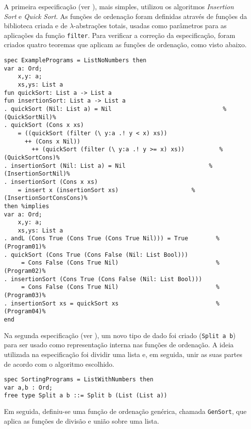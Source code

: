 A primeira especificação (ver ), mais simples, utilizou os algoritmos \textit{Insertion Sort} e \textit{Quick Sort}.
As funções de ordenação foram definidas através de funções da biblioteca criada e de $\lambda$-abstrações totais, usadas como parâmetros para as aplicações da função \Verb.filter..
Para verificar a correção da especificação, foram criados quatro teoremas que aplicam as funções de ordenação, como visto abaixo.

\begin{Verbatim}
spec ExamplePrograms = ListNoNumbers then
var a: Ord;
    x,y: a;
    xs,ys: List a
fun quickSort: List a -> List a
fun insertionSort: List a -> List a
. quickSort (Nil: List a) = Nil                                %(QuickSortNil)%
. quickSort (Cons x xs)                                   
    = ((quickSort (filter (\ y:a .! y < x) xs))           
      ++ (Cons x Nil))                                    
        ++ (quickSort (filter (\ y:a .! y >= x) xs))          %(QuickSortCons)%
. insertionSort (Nil: List a) = Nil                        %(InsertionSortNil)%
. insertionSort (Cons x xs)                               
    = insert x (insertionSort xs)                     %(InsertionSortConsCons)%
then %implies
var a: Ord;
    x,y: a;
    xs,ys: List a
. andL (Cons True (Cons True (Cons True Nil))) = True        %(Program01)%
. quickSort (Cons True (Cons False (Nil: List Bool)))       
     = Cons False (Cons True Nil)                            %(Program02)%
. insertionSort (Cons True (Cons False (Nil: List Bool)))   
     = Cons False (Cons True Nil)                            %(Program03)%
. insertionSort xs = quickSort xs                            %(Program04)%
end
\end{Verbatim}

Na segunda especificação (ver ), um novo tipo de dado foi criado (\Verb.Split a b.) para ser usado como representação interna nas funções de ordenação.
A ideia utilizada na especificação foi dividir uma lista e, em seguida, unir as suas partes de acordo com o algoritmo escolhido.

\begin{Verbatim}
spec SortingPrograms = ListWithNumbers then
var a,b : Ord;
free type Split a b ::= Split b (List (List a))
\end{Verbatim}

Em seguida, definiu-se uma função de ordenação genérica, chamada \Verb.GenSort., que aplica as funções de divisão e união sobre uma lista.

